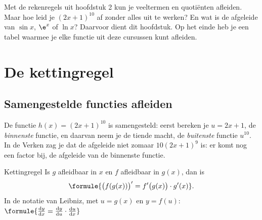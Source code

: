 %



Met de rekenregels uit hoofdstuk 2 kun je veeltermen en quotiënten afleiden. Maar hoe leid je $(2x + 1)^{10}$ af zonder alles uit te werken? En wat is de afgeleide van $\sin x$, $\e^x$ of $\ln x$? Daarvoor dient dit hoofdstuk. Op het einde heb je een tabel waarmee je elke functie uit deze cursussen kunt afleiden.

\begin{oefeningen}[Start]

\end{oefeningen}

\section{De kettingregel}

\subsection{Samengestelde functies afleiden}

De functie $h(x) = (2x + 1)^{10}$ is samengesteld: eerst bereken je $u = 2x + 1$, de \textit{binnenste} functie, en daarvan neem je de tiende macht, de \textit{buitenste} functie $u^{10}$. In de Verken zag je dat de afgeleide niet zomaar $10(2x + 1)^9$ is: er komt nog een factor bij, de afgeleide van de binnenste functie.

\begin{theorie}
\begin{stelling}{Kettingregel}
Is $g$ afleidbaar in $x$ en $f$ afleidbaar in $g(x)$, dan is
\[\formule{\bigl(f(g(x))\bigr)' = f'\bigl(g(x)\bigr) \cdot g'(x)}.\]
In de notatie van Leibniz, met $u = g(x)$ en $y = f(u)$: \qquad $\formule{\frac{\mathrm{d}y}{\mathrm{d}x} = \frac{\mathrm{d}y}{\mathrm{d}u} \cdot \frac{\mathrm{d}u}{\mathrm{d}x}}$
\end{stelling}
\end{theorie}


